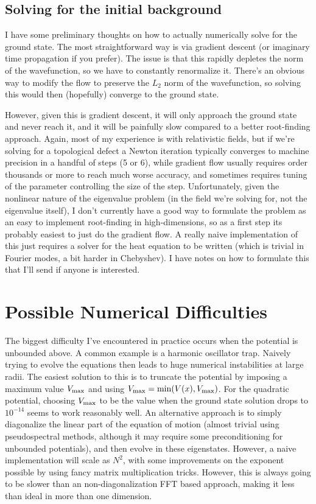\documentclass{revtex4}
\begin{document}
\subsection{Solving for the initial background}
I have some preliminary thoughts on how to actually numerically solve for the ground state.  The most straightforward way is via gradient descent (or imaginary time propagation if you prefer).  The issue is that this rapidly depletes the norm of the wavefunction, so we have to constantly renormalize it.  There's an obvious way to modify the flow to preserve the $L_2$ norm of the wavefunction, so solving this would then (hopefully) converge to the ground state.

However, given this is gradient descent, it will only approach the ground state and never reach it, and it will be painfully slow compared to a better root-finding approach.
 Again, most of my experience is with relativistic fields, but if we're solving for a topological defect a Newton iteration typically converges to machine precision in a handful of steps (5 or 6), while gradient flow usually requires order thousands or more to reach much worse accuracy, and sometimes requires tuning of the parameter controlling the size of the step.
Unfortunately, given the nonlinear nature of the eigenvalue problem (in the field we're solving for, not the eigenvalue itself), I don't currently have a good way to formulate the problem as an easy to implement root-finding in high-dimensions, so as a first step its probably easiest to just do the gradient flow.  A really naive implementation of this just requires a solver for the heat equation to be written (which is trivial in Fourier modes, a bit harder in Chebyshev).  I have notes on how to formulate this that I'll send if anyone is interested.

\section{Possible Numerical Difficulties}
The biggest difficulty I've encountered in practice occurs when the potential is unbounded above.  A common example is a harmonic oscillator trap.  Naively trying to evolve the equations then leads to huge numerical instabilities at large radii.  The easiest solution to this is to truncate the potential by imposing a maximum value $V_{\rm max}$ and using $V_{\rm max} = \mathrm{min}(V(x),V_{\rm max})$.  For the quadratic potential, choosing $V_{\rm max}$ to be the value when the ground state solution drops to $10^{-14}$ seems to work reasonably well.  An alternative approach is to simply diagonalize the linear part of the equation of motion (almost trivial using pseudospectral methods, although it may require some preconditioning for unbounded potentials), and then evolve in these eigenstates.  However, a naive implementation will scale as $N^2$, with some improvements on the exponent possible by using fancy matrix multiplication tricks.  However, this is always going to be slower than an non-diagonalization FFT based approach, making it less than ideal in more than one dimension.
\end{document}
